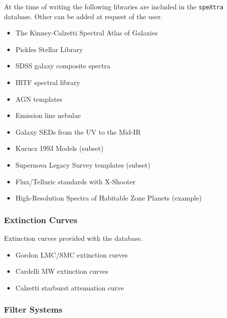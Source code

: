 At the time of writing the following libraries are included in the \texttt{speXtra} database.
Other can be added at request of the user.

\begin{itemize}
\item The Kinney-Calzetti Spectral Atlas of Galaxies

\item Pickles Stellar Library

\item SDSS galaxy composite spectra

\item IRTF spectral library

\item AGN templates

\item Emission line nebulae

\item Galaxy SEDs from the UV to the Mid-IR

\item Kurucz 1993 Models (subset)

\item Supernova Legacy Survey templates (subset)

\item Flux/Telluric standards with X-Shooter

\item High-Resolution Spectra of Habitable Zone Planets (example)
\end{itemize}


\subsubsection{Extinction Curves%
  \label{extinction-curves}%
}

Extinction curves provided with the database.

\begin{itemize}
\item Gordon LMC/SMC extinction curves

\item Cardelli MW extinction curves

\item Calzetti starburst attenuation curve
\end{itemize}


\subsubsection{Filter Systems%
  \label{filter-systems}%
}

